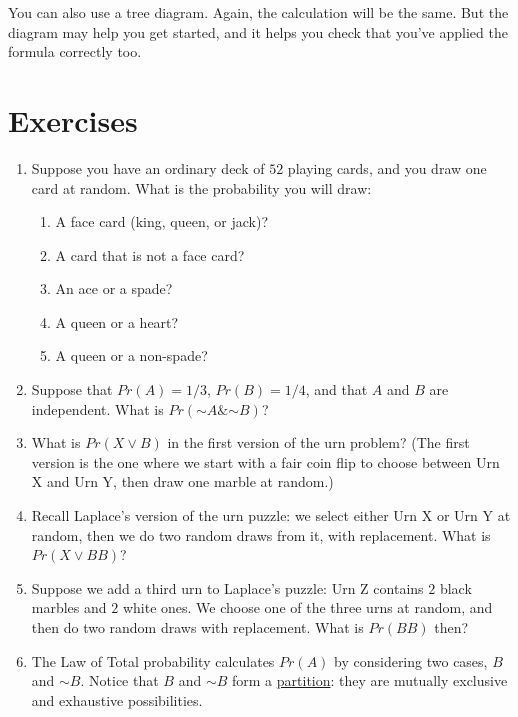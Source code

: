 \documentclass[justified]{tufte-book}
\providecommand{\tightlist}{%
  \setlength{\itemsep}{0pt}\setlength{\parskip}{0pt}}
\renewcommand{\neg}{\mathbin{\sim}}
\renewcommand{\wedge}{\mathbin{\&}}
\newcommand{\p}{Pr}
\theoremstyle{definition}
\theoremstyle{definition}
\theoremstyle{definition}
\theoremstyle{remark}
\begin{document}
You can also use a tree diagram. Again, the calculation will be the
same. But the diagram may help you get started, and it helps you check
that you've applied the formula correctly too.

\hypertarget{exercises-5}{%
\section*{Exercises}\label{exercises-5}}

\begin{enumerate}
\item
  Suppose you have an ordinary deck of \(52\) playing cards, and you
  draw one card at random. What is the probability you will draw:

  \begin{enumerate}
  \def\labelenumii{\alph{enumii}.}
  \tightlist
  \item
    A face card (king, queen, or jack)?
  \item
    A card that is not a face card?
  \item
    An ace or a spade?
  \item
    A queen or a heart?
  \item
    A queen or a non-spade?
  \end{enumerate}
\item
  Suppose that \(Pr(A)=1/3\), \(Pr(B) = 1/4\), and that \(A\) and \(B\)
  are independent. What is \(\p(\neg A \wedge \neg B)\)?
\item
  What is \(\p(X \vee B)\) in the first version of the urn problem? (The
  first version is the one where we start with a fair coin flip to
  choose between Urn X and Urn Y, then draw one marble at random.)
\item
  Recall Laplace's version of the urn puzzle: we select either Urn X or
  Urn Y at random, then we do two random draws from it, with
  replacement. What is \(\p(X \vee BB)\)?
\item
  Suppose we add a third urn to Laplace's puzzle: Urn Z contains \(2\)
  black marbles and \(2\) white ones. We choose one of the three urns at
  random, and then do two random draws with replacement. What is
  \(\p(BB)\) then?
\item
  The Law of Total probability calculates \(\p(A)\) by considering two
  cases, \(B\) and \(\neg B\). Notice that \(B\) and \(\neg B\) form a
  \protect\hyperlink{lessons}{partition}: they are mutually exclusive
  and exhaustive possibilities.


\end{enumerate}
\end{document}

